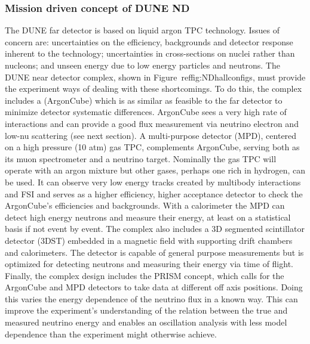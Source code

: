 


\subsubsection{Mission driven concept of DUNE ND}

The DUNE far detector is based on liquid argon TPC technology.
Issues of concern are: uncertainties on the efficiency, backgrounds and detector response inherent to the  technology; uncertainties in cross-sections on nuclei rather than nucleons; and unseen energy due to low energy particles and neutrons. The DUNE near detector complex, shown in Figure~ref{fig:NDhallconfigs}, must provide the experiment ways of dealing with these shortcomings.  To do this, the complex includes a  (ArgonCube) which is as similar as feasible to the far detector to minimize detector systematic differences. ArgonCube sees a very high rate of interactions and can provide a good flux measurement via neutrino electron and low-nu scattering (see next section). A multi-purpose detector (MPD), centered on a high pressure (10 atm) gas TPC, complements ArgonCube, serving both as its muon spectrometer and a neutrino target. Nominally the gas TPC will operate with an argon mixture but other gases, perhaps one rich in hydrogen, can be used. It can observe very low energy tracks created by multibody interactions and FSI and serves as a higher efficiency, higher acceptance detector to check the ArgonCube's efficiencies and backgrounds. With a calorimeter the MPD can detect high energy neutrons and measure their energy, at least on a statistical basis if not event by event. The complex also includes a 3D segmented scintillator detector (3DST) embedded in a magnetic field with supporting drift chambers and calorimeters. The detector is capable of general purpose measurements but is optimized for detecting neutrons and measuring their energy via time of flight. Finally, the complex design includes the PRISM concept, which calls for the ArgonCube and MPD detectors to take data at different off axis positions. Doing this varies the energy dependence of the neutrino flux in a known way. This can improve the experiment's understanding of the relation between the true and measured neutrino energy and enables an oscillation analysis with less model dependence than the experiment might otherwise achieve. 

